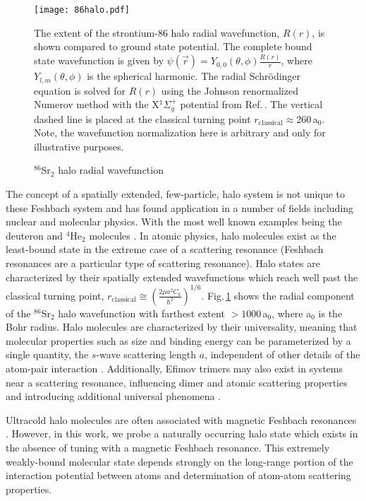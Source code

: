 	\begin{figure}
		\centerline{
		\texttt{[image: 86halo.pdf]}}
		\caption{$^{86}$Sr$_2$ halo radial wavefunction}{The extent of the strontium-86 halo radial wavefunction, $R(r)$, is shown compared to ground state potential. The complete bound state wavefunction is given by $\psi(\vec{r})=Y_{0,0}(\theta,\phi)\frac{R(r)}{r}$, where $Y_{l,m}(\theta,\phi)$ is the spherical harmonic. The radial Schr\"{o}dinger equation is solved for $R(r)$ using the Johnson renormalized Numerov method \cite{Gibson2016, Johnson1978} with the X$^1\Sigma_g^+$ potential from Ref.\,\cite{Stein2010}. The vertical dashed line is placed at the classical turning point $r_\text{classical} \approx 260$\,a$_0$. Note, the wavefunction normalization here is arbitrary and only for illustrative purposes.}
		\label{fig:86halo}
	\end{figure} 
The concept of a spatially extended, few-particle, halo system is not unique to these Feshbach system and has found application in a number of fields including nuclear and molecular physics.
With the most well known examples being the deuteron and $^4$He$_2$ molecules \cite{lmk93,sto94,Kohler2006}.
In atomic physics, halo molecules exist as the least-bound state in the extreme case of a scattering resonance (Feshbach resonances are a particular type of scattering resonance).
Halo states are characterized by their spatially extended wavefunctions which reach well past the classical turning point, $r_\text{classical} \cong \left( \frac{2 \mu a^2 C_6}{\hbar^2} \right)^{1/6}$.
Fig.\,\ref{fig:86halo} shows the radial component of the $^{86}$Sr$_2$ halo wavefunction with farthest extent $>\!1000$\,a$_0$, where a$_0$ is the Bohr radius.
Halo molecules are characterized by their universality, meaning that molecular properties such as size and binding energy can be parameterized by a single quantity, the $s$-wave scattering length $a$, independent of other details of the atom-pair interaction \cite{Kohler2006,bha06}. 
Additionally, Efimov trimers may also exist in systems near a scattering resonance, influencing dimer and atomic scattering properties and introducing additional universal phenomena \cite{bha07,nen17}.

Ultracold halo molecules are often associated with magnetic Feshbach resonances \cite{Chin2010}.
However, in this work, we probe a naturally occurring halo state which exists in the absence of tuning with a magnetic Feshbach resonance. 
This extremely weakly-bound molecular state depends strongly on the long-range portion of the interaction potential between atoms and determination of atom-atom scattering properties.

